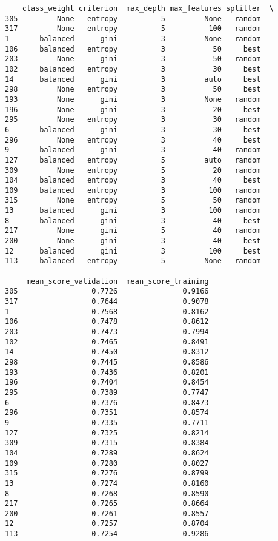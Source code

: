 \documentclass[11pt]{article}
\begin{document}
    
    \begin{verbatim}
    class_weight criterion  max_depth max_features splitter  \
305         None   entropy          5         None   random   
317         None   entropy          5          100   random   
1       balanced      gini          3         None   random   
106     balanced   entropy          3           50     best   
203         None      gini          3           50   random   
102     balanced   entropy          3           30     best   
14      balanced      gini          3         auto     best   
298         None   entropy          3           50     best   
193         None      gini          3         None   random   
196         None      gini          3           20     best   
295         None   entropy          3           30   random   
6       balanced      gini          3           30     best   
296         None   entropy          3           40     best   
9       balanced      gini          3           40   random   
127     balanced   entropy          5         auto   random   
309         None   entropy          5           20   random   
104     balanced   entropy          3           40     best   
109     balanced   entropy          3          100   random   
315         None   entropy          5           50   random   
13      balanced      gini          3          100   random   
8       balanced      gini          3           40     best   
217         None      gini          5           40   random   
200         None      gini          3           40     best   
12      balanced      gini          3          100     best   
113     balanced   entropy          5         None   random   

     mean_score_validation  mean_score_training  
305                 0.7726               0.9166  
317                 0.7644               0.9078  
1                   0.7568               0.8162  
106                 0.7478               0.8612  
203                 0.7473               0.7994  
102                 0.7465               0.8491  
14                  0.7450               0.8312  
298                 0.7445               0.8586  
193                 0.7436               0.8201  
196                 0.7404               0.8454  
295                 0.7389               0.7747  
6                   0.7376               0.8473  
296                 0.7351               0.8574  
9                   0.7335               0.7711  
127                 0.7325               0.8214  
309                 0.7315               0.8384  
104                 0.7289               0.8624  
109                 0.7280               0.8027  
315                 0.7276               0.8799  
13                  0.7274               0.8160  
8                   0.7268               0.8590  
217                 0.7265               0.8664  
200                 0.7261               0.8557  
12                  0.7257               0.8704  
113                 0.7254               0.9286  
    \end{verbatim}
\end{document}
